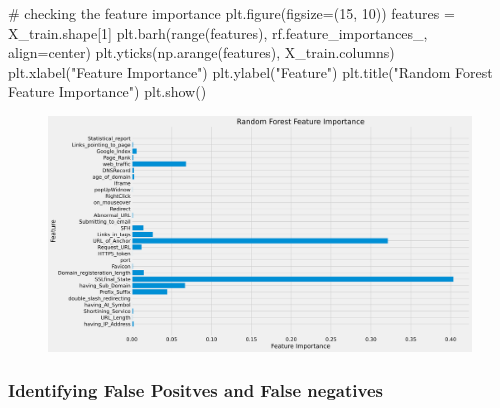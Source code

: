 \documentclass[
  letterpaper,
  DIV=11,
  numbers=noendperiod]{scrartcl}
\newenvironment{Shaded}{\begin{snugshade}}{\end{snugshade}}
\newcommand{\BuiltInTok}[1]{\textcolor[rgb]{0.00,0.23,0.31}{#1}}
\newcommand{\CommentTok}[1]{\textcolor[rgb]{0.37,0.37,0.37}{#1}}
\newcommand{\DecValTok}[1]{\textcolor[rgb]{0.68,0.00,0.00}{#1}}
\newcommand{\NormalTok}[1]{\textcolor[rgb]{0.00,0.23,0.31}{#1}}
\newcommand{\OperatorTok}[1]{\textcolor[rgb]{0.37,0.37,0.37}{#1}}
\newcommand{\StringTok}[1]{\textcolor[rgb]{0.13,0.47,0.30}{#1}}
\begin{document}
\begin{Shaded}
\begin{Highlighting}[]
\CommentTok{\# checking the feature importance}
\NormalTok{plt.figure(figsize}\OperatorTok{=}\NormalTok{(}\DecValTok{15}\NormalTok{, }\DecValTok{10}\NormalTok{))}
\NormalTok{features }\OperatorTok{=}\NormalTok{ X\_train.shape[}\DecValTok{1}\NormalTok{]}
\NormalTok{plt.barh(}\BuiltInTok{range}\NormalTok{(features), rf.feature\_importances\_, align}\OperatorTok{=}\StringTok{\textquotesingle{}center\textquotesingle{}}\NormalTok{)}
\NormalTok{plt.yticks(np.arange(features), X\_train.columns)}
\NormalTok{plt.xlabel(}\StringTok{"Feature Importance"}\NormalTok{)}
\NormalTok{plt.ylabel(}\StringTok{"Feature"}\NormalTok{)}
\NormalTok{plt.title(}\StringTok{"Random Forest Feature Importance"}\NormalTok{)}
\NormalTok{plt.show()}
\end{Highlighting}
\end{Shaded}

\begin{figure}[H]

{\centering \includegraphics{project_files/figure-pdf/cell-26-output-1.svg}

}

\end{figure}

\hypertarget{identifying-false-positves-and-false-negatives}{%
\subsubsection{Identifying False Positves and False
negatives}\label{identifying-false-positves-and-false-negatives}}
\end{document}
